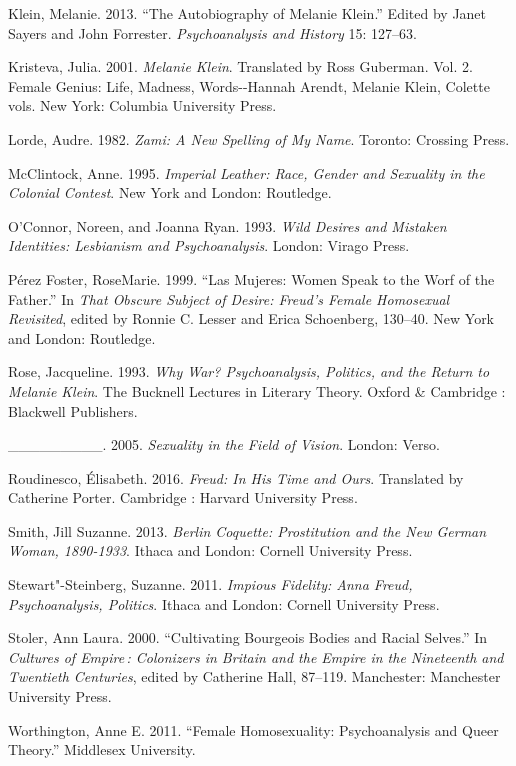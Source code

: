 Klein, Melanie. 2013. ``The Autobiography of Melanie Klein.'' Edited by
Janet Sayers and John Forrester. \emph{Psychoanalysis and History} 15:
127--63.

Kristeva, Julia. 2001. \emph{Melanie Klein}. Translated by Ross
Guberman. Vol. 2. Female Genius: Life, Madness, Words-\/-Hannah Arendt, %
Melanie Klein, Colette vols. New York: Columbia University Press.

Lorde, Audre. 1982. \emph{Zami: A New Spelling of My Name}. Toronto:
Crossing Press.

McClintock, Anne. 1995. \emph{Imperial Leather: Race, Gender and
Sexuality in the Colonial Contest}. New York and London: Routledge.

O'Connor, Noreen, and Joanna Ryan. 1993. \emph{Wild Desires and Mistaken
Identities: Lesbianism and Psychoanalysis}. London: Virago Press.

Pérez Foster, RoseMarie. 1999. ``Las Mujeres: Women Speak to the Worf of
the Father.'' In \emph{That Obscure Subject of Desire: Freud's Female
Homosexual Revisited}, edited by Ronnie C. Lesser and Erica Schoenberg,
130--40. New York and London: Routledge.

Rose, Jacqueline. 1993. \emph{Why War? Psychoanalysis, Politics, and the
Return to Melanie Klein}. The Bucknell Lectures in Literary Theory.
Oxford \& Cambridge : Blackwell Publishers.

\_\_\_\_\_\_\_\_\_. 2005. \emph{Sexuality in the Field of Vision}. London: Verso.

Roudinesco, Élisabeth. 2016. \emph{Freud: In His Time and Ours}.
Translated by Catherine Porter. Cambridge : Harvard University Press.

Smith, Jill Suzanne. 2013. \emph{Berlin Coquette: Prostitution and the
New German Woman, 1890-1933}. Ithaca and London: Cornell University
Press.

Stewart"-Steinberg, Suzanne. 2011. \emph{Impious Fidelity: Anna Freud,
Psychoanalysis, Politics}. Ithaca and London: Cornell University Press.

Stoler, Ann Laura. 2000. ``Cultivating Bourgeois Bodies and Racial
Selves.'' In \emph{Cultures of Empire\,: Colonizers in Britain and the
Empire in the Nineteenth and Twentieth Centuries}, edited by Catherine
Hall, 87--119. Manchester: Manchester University Press.

Worthington, Anne E. 2011. ``Female Homosexuality: Psychoanalysis and
Queer Theory.'' Middlesex University.

